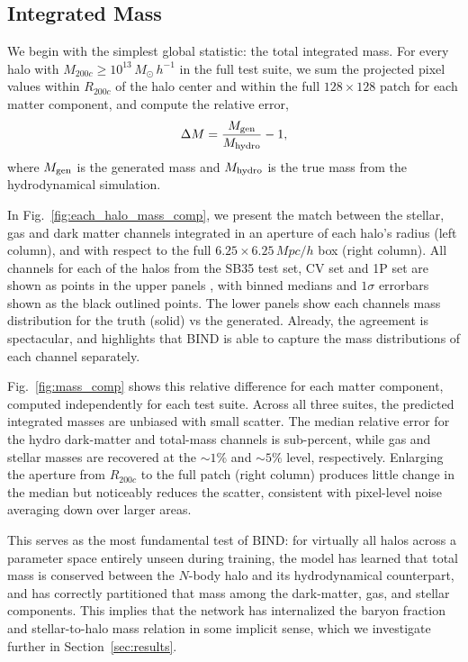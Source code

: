 \documentclass[linenumbers,trackchanges, twocolumn]{aastex701}
\begin{document}
\subsection{Integrated Mass}
\label{subsec:integrated_mass}


We begin with the simplest global statistic: the total integrated mass. For every halo with $M_{200c} \geq 10^{13}\,M_{\odot}\,h^{-1}$ in the full test suite, we sum the projected pixel values within $R_{200c}$ of the halo center and within the full $128\times128$ patch for each matter component, and compute the relative error,
\begin{equation}
    \Delta M = \frac{M_{\rm gen}}{M_{\rm hydro}} - 1,
    \label{eq:mass_err}
\end{equation}
where $M_{\rm gen}$ is the generated mass and $M_{\rm hydro}$ is the true mass from the hydrodynamical simulation. 

In Fig.~\ref{fig:each_halo_mass_comp}, we present the match between the stellar, gas and dark matter channels integrated in an aperture of each halo's radius (left column), and with respect to the full $6.25\times6.25\,Mpc/h$ box (right column). All channels for each of the halos from the SB35 test set, CV set and 1P set are shown as points in the upper panels , with binned medians and $1\sigma$ errorbars shown as the black outlined points. The lower panels show each channels mass distribution for the truth (solid) vs the generated. Already, the agreement is spectacular, and highlights that BIND is able to capture the mass distributions of each channel separately. 


Fig.~\ref{fig:mass_comp} shows this relative difference for each matter component, computed independently for each test suite. Across all three suites, the predicted integrated masses are unbiased with small scatter. The median relative error for the hydro dark-matter and total-mass channels is sub-percent, while gas and stellar masses are recovered at the ${\sim}1\%$ and ${\sim}5\%$ level, respectively. Enlarging the aperture from $R_{200c}$ to the full patch (right column) produces little change in the median but noticeably reduces the scatter, consistent with pixel-level noise averaging down over larger areas.

This serves as the most fundamental test of \textsc{BIND}: for virtually all halos across a parameter space entirely unseen during training, the model has learned that total mass is conserved between the $N$-body halo and its hydrodynamical counterpart, and has correctly partitioned that mass among the dark-matter, gas, and stellar components. This implies that the network has internalized the baryon fraction and stellar-to-halo mass relation in some implicit sense, which we investigate further in Section~\ref{sec:results}.
\end{document}
